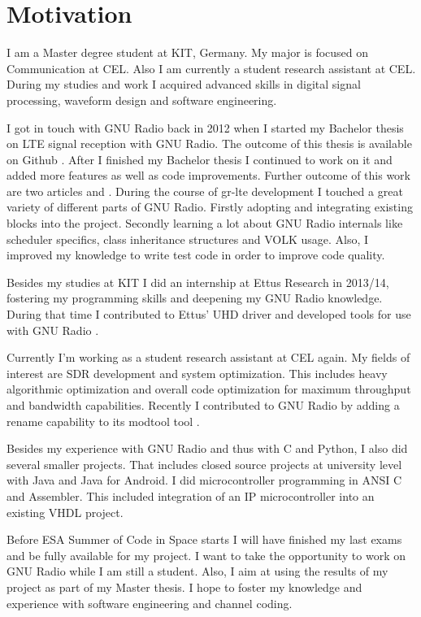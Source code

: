 \documentclass[a4paper,12pt]{scrartcl}
\def\CC{{C\nolinebreak[4]\hspace{-.05em}\raisebox{.4ex}{\tiny\textbf{++}}}}
\begin{document}
\section{Motivation}
I am a Master degree student at \ac{KIT}, Germany.
My major is focused on Communication at \ac{CEL}.
Also I am currently a student research assistant at \ac{CEL}.
During my studies and work I acquired advanced skills in digital signal processing, waveform design and software engineering.

I got in touch with GNU Radio back in 2012 when I started my Bachelor thesis on {\ac{LTE} signal reception with GNU Radio}.
The outcome of this thesis is available on Github \cite{repo:gr-lte}.
After I finished my Bachelor thesis I continued to work on it and added more features as well as code improvements.
Further outcome of this work are two articles \cite{lte:winncomm2013} and \cite{lte:springer2015}.
During the course of gr-lte development I touched a great variety of different parts of GNU Radio.
Firstly adopting and integrating existing blocks into the project.
Secondly learning a lot about GNU Radio internals like scheduler specifics, class inheritance structures and \ac{VOLK} usage.
Also, I improved my knowledge to write test code in order to improve code quality.

Besides my studies at \ac{KIT} I did an internship at Ettus Research in 2013/14, fostering my programming skills and deepening my GNU Radio knowledge.
During that time I contributed to Ettus' UHD driver and developed tools for use with GNU Radio \cite{repo:gr-misc}.

Currently I'm working as a student research assistant at \ac{CEL} again.
My fields of interest are \ac{SDR} development and system optimization.
This includes heavy algorithmic optimization and overall code optimization for maximum throughput and bandwidth capabilities.
Recently I contributed to GNU Radio by adding a rename capability to its modtool tool \cite{repo:gr-rename-contribution}.

Besides my experience with GNU Radio and thus with \CC{} and Python, I also did several smaller projects.
That includes closed source projects at university level with Java and Java for Android.
I did microcontroller programming in ANSI C and Assembler.
This included integration of an IP microcontroller into an existing VHDL project.

Before \ac{ESA} Summer of Code in Space starts I will have finished my last exams and be fully available for my project.
I want to take the opportunity to work on GNU Radio while I am still a student.
Also, I aim at using the results of my project as part of my Master thesis.
I hope to foster my knowledge and experience with software engineering and channel coding.
\end{document}
